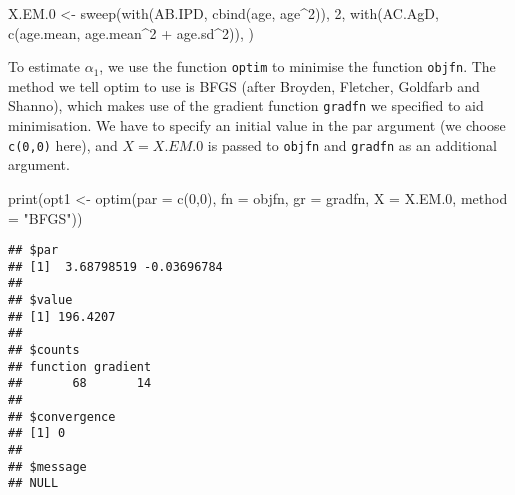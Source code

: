 \documentclass[
]{article}
\newenvironment{Shaded}{\begin{snugshade}}{\end{snugshade}}
\newcommand{\AttributeTok}[1]{\textcolor[rgb]{0.77,0.63,0.00}{#1}}
\newcommand{\DecValTok}[1]{\textcolor[rgb]{0.00,0.00,0.81}{#1}}
\newcommand{\FloatTok}[1]{\textcolor[rgb]{0.00,0.00,0.81}{#1}}
\newcommand{\FunctionTok}[1]{\textcolor[rgb]{0.00,0.00,0.00}{#1}}
\newcommand{\NormalTok}[1]{#1}
\newcommand{\OtherTok}[1]{\textcolor[rgb]{0.56,0.35,0.01}{#1}}
\newcommand{\SpecialCharTok}[1]{\textcolor[rgb]{0.00,0.00,0.00}{#1}}
\newcommand{\StringTok}[1]{\textcolor[rgb]{0.31,0.60,0.02}{#1}}
\begin{document}
\begin{Shaded}
\begin{Highlighting}[]
\NormalTok{X.EM}\FloatTok{.0} \OtherTok{\textless{}{-}} \FunctionTok{sweep}\NormalTok{(}\FunctionTok{with}\NormalTok{(AB.IPD, }\FunctionTok{cbind}\NormalTok{(age, age}\SpecialCharTok{\^{}}\DecValTok{2}\NormalTok{)), }\DecValTok{2}\NormalTok{,}
                \FunctionTok{with}\NormalTok{(AC.AgD, }\FunctionTok{c}\NormalTok{(age.mean, age.mean}\SpecialCharTok{\^{}}\DecValTok{2} \SpecialCharTok{+}\NormalTok{ age.sd}\SpecialCharTok{\^{}}\DecValTok{2}\NormalTok{)), }\StringTok{\textquotesingle{}{-}\textquotesingle{}}\NormalTok{)}
\end{Highlighting}
\end{Shaded}

To estimate \(\alpha_{1}\), we use the function \texttt{optim} to
minimise the function \texttt{objfn}. The method we tell optim to use is
BFGS (after Broyden, Fletcher, Goldfarb and Shanno), which makes use of
the gradient function \texttt{gradfn} we specified to aid minimisation.
We have to specify an initial value in the par argument (we choose
\texttt{c(0,0)} here), and \(X=X.EM.0\) is passed to \texttt{objfn} and
\texttt{gradfn} as an additional argument.

\begin{Shaded}
\begin{Highlighting}[]
\FunctionTok{print}\NormalTok{(opt1 }\OtherTok{\textless{}{-}} \FunctionTok{optim}\NormalTok{(}\AttributeTok{par =} \FunctionTok{c}\NormalTok{(}\DecValTok{0}\NormalTok{,}\DecValTok{0}\NormalTok{), }\AttributeTok{fn =}\NormalTok{ objfn, }\AttributeTok{gr =}\NormalTok{ gradfn, }\AttributeTok{X =}\NormalTok{ X.EM}\FloatTok{.0}\NormalTok{, }\AttributeTok{method =} \StringTok{"BFGS"}\NormalTok{))}
\end{Highlighting}
\end{Shaded}

\begin{verbatim}
## $par
## [1]  3.68798519 -0.03696784
## 
## $value
## [1] 196.4207
## 
## $counts
## function gradient 
##       68       14 
## 
## $convergence
## [1] 0
## 
## $message
## NULL
\end{verbatim}

\begin{Shaded}
\end{Shaded}
\end{document}
